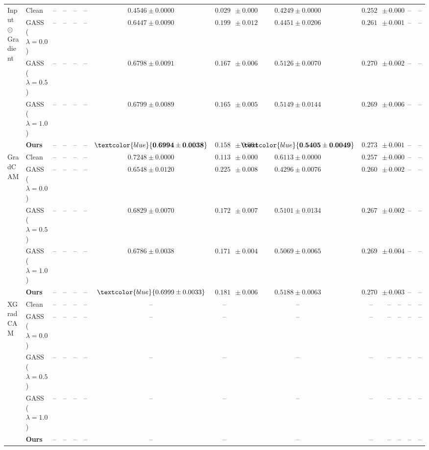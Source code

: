 \begin{table}[t]
{\begin{tabular}{ll|cccc|cccc|cccc}
\multirow{5}{*}{Input $\odot$ Gradient}
& Clean & -- & -- & -- & -- & $0.4546 \pm 0.0000$ & $\mathbf{0.0297 \pm 0.0000}$ & $0.4249 \pm 0.0000$ & $0.2523 \pm 0.0000$ & -- & -- & -- & -- \\
& GASS ($\lambda=0.0$) & -- & -- & -- & -- & $0.6447 \pm 0.0090$ & $0.1996 \pm 0.0120$ & $0.4451 \pm 0.0206$ & $0.2615 \pm 0.0015$ & -- & -- & -- & -- \\
& GASS ($\lambda=0.5$) & -- & -- & -- & -- & $0.6798 \pm 0.0091$ & $0.1672 \pm 0.0066$ & $0.5126 \pm 0.0070$ & $0.2702 \pm 0.0025$ & -- & -- & -- & -- \\
& GASS ($\lambda=1.0$) & -- & -- & -- & -- & $0.6799 \pm 0.0089$ & $0.1651 \pm 0.0056$ & $0.5149 \pm 0.0144$ & $0.2695 \pm 0.0065$ & -- & -- & -- & -- \\
& \textbf{Ours} & -- & -- & -- & -- & $\textcolor{blue}{\mathbf{0.6994 \pm 0.0038}}$ & $0.1589 \pm 0.0046$ & $\textcolor{blue}{\mathbf{0.5405 \pm 0.0049}}$ & $\mathbf{0.2734 \pm 0.0018}$ & -- & -- & -- & -- \\
\midrule

\multirow{5}{*}{GradCAM}
& Clean & -- & -- & -- & -- & $\mathbf{0.7248 \pm 0.0000}$ & $\mathbf{0.1136 \pm 0.0000}$ & $\mathbf{0.6113 \pm 0.0000}$ & $0.2573 \pm 0.0000$ & -- & -- & -- & -- \\
& GASS ($\lambda=0.0$) & -- & -- & -- & -- & $0.6548 \pm 0.0120$ & $0.2252 \pm 0.0080$ & $0.4296 \pm 0.0076$ & $0.2602 \pm 0.0020$ & -- & -- & -- & -- \\
& GASS ($\lambda=0.5$) & -- & -- & -- & -- & $0.6829 \pm 0.0070$ & $0.1728 \pm 0.0074$ & $0.5101 \pm 0.0134$ & $0.2672 \pm 0.0028$ & -- & -- & -- & -- \\
& GASS ($\lambda=1.0$) & -- & -- & -- & -- & $0.6786 \pm 0.0038$ & $0.1717 \pm 0.0040$ & $0.5069 \pm 0.0065$ & $0.2697 \pm 0.0043$ & -- & -- & -- & -- \\
& \textbf{Ours} & -- & -- & -- & -- & $\textcolor{blue}{0.6999 \pm 0.0033}$ & $0.1811 \pm 0.0061$ & $0.5188 \pm 0.0063$ & $\mathbf{0.2700 \pm 0.0035}$ & -- & -- & -- & -- \\
\midrule

\multirow{5}{*}{XGradCAM}
& Clean & -- & -- & -- & -- & -- & -- & -- & -- & -- & -- & -- & -- \\
& GASS ($\lambda=0.0$) & -- & -- & -- & -- & -- & -- & -- & -- & -- & -- & -- & -- \\
& GASS ($\lambda=0.5$) & -- & -- & -- & -- & -- & -- & -- & -- & -- & -- & -- & -- \\
& GASS ($\lambda=1.0$) & -- & -- & -- & -- & -- & -- & -- & -- & -- & -- & -- & -- \\
& \textbf{Ours} & -- & -- & -- & -- & -- & -- & -- & -- & -- & -- & -- & -- \\


\end{tabular}}
\end{table}
